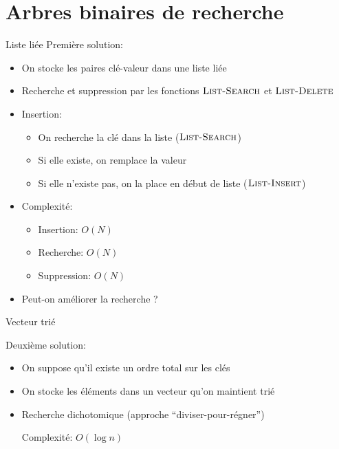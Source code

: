 \section{Arbres binaires de recherche}

\begin{frame}{Liste liée}
Première solution:
\begin{itemize}
\item On stocke les paires clé-valeur dans une liste liée
\item Recherche et suppression par les fonctions $\textnormal{\scshape List-Search}$ et $\textnormal{\scshape List-Delete}$\\
\item Insertion:
\begin{itemize}
\item On recherche la clé dans la liste ($\textnormal{\scshape List-Search}$)
\item Si elle existe, on remplace la valeur
\item Si elle n'existe pas, on la place en début de liste ($\textnormal{\scshape List-Insert}$)
\end{itemize}
\item Complexité:
\begin{itemize}
\item Insertion: $O(N)$
\item Recherche: $O(N)$
\item Suppression: $O(N)$
\end{itemize}
\item Peut-on améliorer la recherche ?
\end{itemize}
\end{frame}

\begin{frame}{Vecteur trié}

Deuxième solution:
\begin{itemize}
\item On suppose qu'il existe un ordre total sur les clés
\item On stocke les éléments dans un \alert{vecteur} qu'on maintient trié
\item Recherche dichotomique (approche ``diviser-pour-régner'')

\begin{center}
\begin{small}
\end{small}
\end{center}
Complexité: $O(\log n)$
\end{itemize}

\end{frame}

